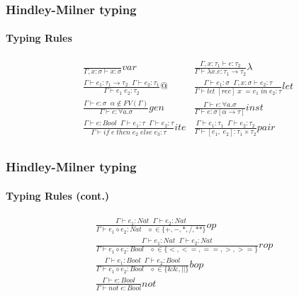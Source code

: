 \documentclass[xcolor=table]{beamer}
\begin{document}
\begin{frame}
\frametitle{Hindley-Milner typing}
\framesubtitle{Typing Rules}

\begin{small}
\begin{align*}
& \frac{}{\Gamma , x: \sigma \vdash x:\sigma }var  
& \frac{\Gamma, x:\tau_1 \vdash e:\tau_2}{\Gamma \vdash \lambda x. e:\tau_1 \rightarrow \tau_2}\lambda \\[0.3cm]
& \frac{\Gamma \vdash e_1:\tau_1\rightarrow\tau_2 \;\; \Gamma \vdash e_2:\tau_1}{\Gamma \vdash e_1 \; e_2:\tau_2 }@ 
& \frac{\Gamma \vdash e_1:\sigma \;\;\Gamma, x:\sigma \vdash e_2:\tau}{\Gamma \vdash let \; [rec] \; x \; = e_1 \; in \; e_2:\tau }let \\[0.3cm]
& \frac{\Gamma \vdash e: \sigma \;\; \alpha \not \in FV(\Gamma)}{\Gamma \vdash e: \forall a. \sigma }gen 
& \frac{\Gamma \vdash e: \forall a. \sigma }{\Gamma \vdash e:\sigma [\alpha \rightarrow \tau ] }inst \\[0.3cm]
& \frac{\Gamma \vdash e : Bool \;\; \Gamma \vdash e_1:\tau \;\; \Gamma \vdash e_2:\tau}{\Gamma \vdash if \; e \; then \; e_2 \; else \;e_3 : \tau}ite
& \frac{\Gamma \vdash e_1:\tau_1 \;\; \Gamma \vdash e_2:\tau_2}{\Gamma \vdash [e_1, \; e_2]:\tau_1\times \tau_2  }pair \\[0.3cm]
\end{align*}
\end{small}
\end{frame} 

\begin{frame}
\frametitle{Hindley-Milner typing}
\framesubtitle{Typing Rules (cont.)}
\begin{small}
 \begin{gather*}
 \frac{\Gamma \vdash e_1 : Nat \;\; \Gamma \vdash e_2: Nat }{\Gamma \vdash e_1 \diamond e_2: Nat \;\;\; \diamond \in \lbrace +, -, *, /, **\rbrace}op \\[0.3cm]
 \frac{\Gamma \vdash e_1 : Nat \;\; \Gamma \vdash e_2: Nat }{\Gamma \vdash e_1 \diamond e_2: Bool \;\;\; \diamond \in \lbrace <, <=,==,>,>=\rbrace}rop \\[0.3cm]
 \frac{\Gamma \vdash e_1 : Bool \;\; \Gamma \vdash e_2: Bool }{\Gamma \vdash e_1 \diamond e_2: Bool \;\;\; \diamond \in \lbrace \&\&, || \rbrace }bop \\[0.3cm]
 \frac{\Gamma \vdash e : Bool }{\Gamma \vdash not \; e: Bool}not \\
\end{gather*}
\end{small}
\end{frame} 
\end{document}
